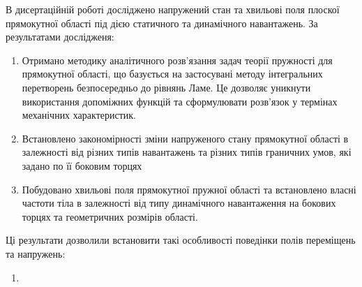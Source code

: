 В дисертаційній роботі досліджено напружений стан та хвильові поля плоскої прямокутної області
під дією статичного та динамічного навантажень. За результатами дослідженя:
\begin{enumerate}
    \item Отримано методику аналітичного розв'язання задач теорії пружності для прямокутної області,
    що базується на застосувані методу інтегральних перетворень безпосередньо до рівнянь Ламе.
    Це дозволяє уникнути використання допоміжних функцій та сформулювати розв'язок у термінах механічних характеристик.

    \item Встановлено закономірності зміни напруженого стану прямокутної області в залежності від різних типів навантажень та різних типів граничних умов,
    які задано по її боковим торцях 

    \item Побудовано хвильові поля прямокутної пружної області та встановлено власні частоти тіла в залежності від типу динамічного навантаження на бокових торцях та геометричних розмірів області.
\end{enumerate}

Ці результати дозволили встановити такі особливості поведінки полів переміщень та напружень:
\begin{enumerate}
    \item 
\end{enumerate}